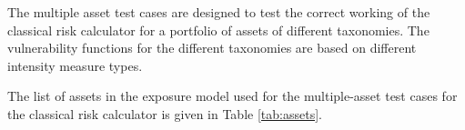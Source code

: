 The multiple asset test cases are designed to test the correct working of the classical risk calculator for a portfolio of assets of different taxonomies. The vulnerability functions for the different taxonomies are based on different intensity measure types.



The list of assets in the exposure model used for the multiple-asset test cases for the classical risk calculator is given in Table \ref{tab:assets}.